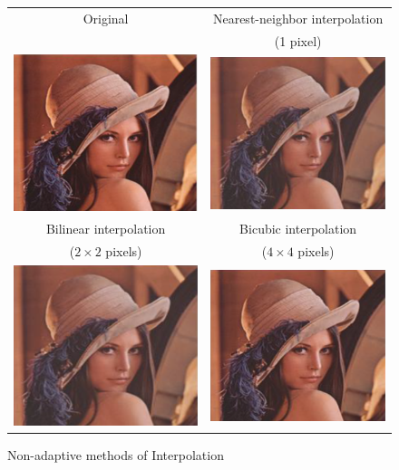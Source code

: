 \begin{figure}[t]
\centering
{\sffamily
\begin{tabular}{cc}
Original & Nearest-neighbor interpolation\\
 & (1 pixel) \\
\includegraphics[width=.4\linewidth]{img/preprocessing/interp_orig.png}
&
\includegraphics[width=.4\linewidth]{img/preprocessing/interp_nn.png}
\vspace{1em} \\
Bilinear interpolation & Bicubic interpolation \\
($2\times2$ pixels) & ($4\times4$ pixels) \\
\includegraphics[width=.4\linewidth]{img/preprocessing/interp_bili.png}
&
\includegraphics[width=.4\linewidth]{img/preprocessing/interp_bicubic.png}
\end{tabular}
}
\caption{Non-adaptive methods of Interpolation}
\label{fig:preprocessInterpolation}
\end{figure}

